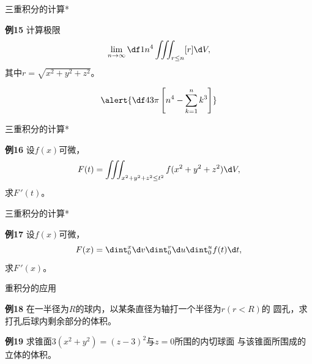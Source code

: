 
\begin{frame}{三重积分的计算*}
	\linespread{1.2}
	\begin{exampleblock}{{\bf 例15}\hfill}
		计算极限
		$$\lim\limits_{n\to\infty}\df 1{n^4}\iiint_{r\leq n}[r]\d V,$$
		其中$r=\sqrt{x^2+y^2+z^2}$。
	\end{exampleblock}
	\pause
	$$\alert{\df 43\pi\left[n^4-\sum
	\limits_{k=1}^nk^3\right]}$$
\end{frame}

\begin{frame}{三重积分的计算*}
	\linespread{1.2}
	\begin{exampleblock}{{\bf 例16}\hfill}
		设$f(x)$可微，
		$$F(t)=\iiint_{x^2+y^2+z^2\leq t^2}f(x^2+y^2+z^2)\d V,$$
		求$F\,'(t)$。
	\end{exampleblock}
\end{frame}

\begin{frame}{三重积分的计算*}
	\linespread{1.2}
	\begin{exampleblock}{{\bf 例17}\hfill}
		设$f(x)$可微，
		$$F(x)=\dint_0^x\d v\dint_0^v\d u\dint_0^uf(t)\d t,$$
		求$F\,'(x)$。
	\end{exampleblock}
\end{frame}


\begin{frame}{重积分的应用}
	\linespread{1.2}
	\begin{exampleblock}{{\bf 例18}\hfill}
		在一半径为$R$的球内，以某条直径为轴打一个半径为$r(r<R)$的
		圆孔，求打孔后球内剩余部分的体积。
	\end{exampleblock}
	\bigskip\pause
	\begin{exampleblock}{{\bf 例19}\hfill}
		求锥面$3(x^2+y^2)=(z-3)^2$与$z=0$所围的内切球面
		与该锥面所围成的立体的体积。
	\end{exampleblock}
\end{frame}

